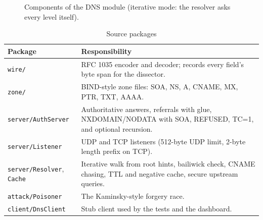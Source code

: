 \documentclass[11pt,a4paper]{article}
\begin{document}
\begin{figure}[H]
\centering
{}
\caption{Components of the DNS module (iterative mode: the resolver asks every level itself).}
\end{figure}

\begin{table}[H]
\centering
\caption{Source packages}
\small
\begin{tabularx}{\textwidth}{@{}lY@{}}
\toprule
\textbf{Package} & \textbf{Responsibility} \\ \midrule
\texttt{wire/} & RFC 1035 encoder and decoder; records every field's byte span for the dissector. \\
\texttt{zone/} & BIND-style zone files: SOA, NS, A, CNAME, MX, PTR, TXT, AAAA. \\
\texttt{server/AuthServer} & Authoritative answers, referrals with glue, NXDOMAIN/NODATA with SOA, REFUSED, TC=1, and optional recursion. \\
\texttt{server/Listener} & UDP and TCP listeners (512-byte UDP limit, 2-byte length prefix on TCP). \\
\texttt{server/Resolver}, \texttt{Cache} & Iterative walk from root hints, bailiwick check, CNAME chasing, TTL and negative cache, secure upstream queries. \\
\texttt{attack/Poisoner} & The Kaminsky-style forgery race. \\
\texttt{client/DnsClient} & Stub client used by the tests and the dashboard. \\ \bottomrule
\end{tabularx}
\end{table}
\end{document}

